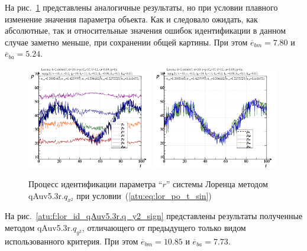 На рис.~\ref{atu:f:lor_id_qAuv5.3r.q_x2_sin} представлены аналогичные результаты,
но при условии плавного изменение значения параметра объекта. Как и следовало ожидать,
как абсолютные, так и относительные значения ошибок идентификации в данном случае заметно
меньше, при сохранении общей картины.
При этом
$\overline{e}_{bm}=7.80$
и
$\overline{e}_{ba}=5.24$.


\begin{figure}[h!]
  \centerline{
    \includegraphics[width=0.49\textwidth]{p/cha/lor/qAuv5.3r/lor_qAuv5_3r_qy2-p_t_pi_sin.png}
    \hfill
    \includegraphics[width=0.49\textwidth]{p/cha/lor/qAuv5.3r/lor_qAuv5_3r_qy2-p_t_pz_sin.png}
  }
  \caption{Процесс идентификации параметра ``$r$'' системы Лоренца методом qAuv5.3r.$q_{x^2}$ при условии~(\ref{atu:eq:lor_po_t_sin})}
  \label{atu:f:lor_id_qAuv5.3r.q_x2_sin}
\end{figure}


На рис.~\ref{atu:f:lor_id_qAuv5.3r.q_y2_sign} представлены результаты
полученные методом qAuv5.3r.$q_{y^2}$,
отличающего от предыдущего только видом использованного критерия.
При этом
$\overline{e}_{bm}=10.85$
и
$\overline{e}_{ba}=7.73$.

